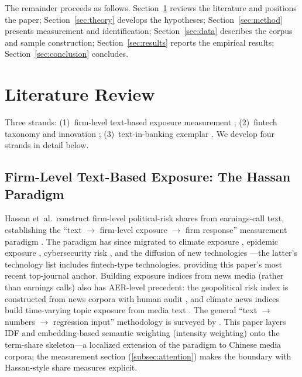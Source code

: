 The remainder proceeds as follows. Section~\ref{sec:lit} reviews the
literature and positions the paper; Section~\ref{sec:theory} develops the
hypotheses; Section~\ref{sec:method} presents measurement and identification;
Section~\ref{sec:data} describes the corpus and sample construction;
Section~\ref{sec:results} reports the empirical results;
Section~\ref{sec:conclusion} concludes.

\section{Literature Review}\label{sec:lit}
Three strands: (1)~firm-level text-based exposure measurement
\autocite{hassan2019firm,florackis2023cybersecurity};
(2)~fintech taxonomy and innovation \autocite{gomber2018fintech,goldstein2019fintech};
(3)~text-in-banking exemplar \autocite{engelberg2018short}.
We develop four strands in detail below.

\subsection{Firm-Level Text-Based Exposure: The Hassan Paradigm}
Hassan et~al.\ construct firm-level political-risk shares from earnings-call
text, establishing the ``text $\to$ firm-level exposure $\to$ firm response''
measurement paradigm \parencite{hassan2019firm}. The paradigm has since
migrated to climate exposure \parencite{sautner2023climate}, epidemic exposure
\parencite{hassan2023epidemic}, cybersecurity risk
\parencite{florackis2023cybersecurity}, and the diffusion of new technologies
\parencite{kalyani2025diffusion}---the latter's technology list includes
fintech-type technologies, providing this paper's most recent top-journal
anchor. Building exposure indices from news media (rather than earnings calls)
also has AER-level precedent: the geopolitical risk index is constructed from
news corpora with human audit \parencite{caldara2022geopolitical}, and climate
news indices build time-varying topic exposure from media text
\parencite{engle2020hedging}. The general ``text $\to$ numbers $\to$
regression input'' methodology is surveyed by \textcite{gentzkow2019text}.
This paper layers IDF and embedding-based semantic weighting (intensity
weighting) onto the term-share skeleton---a localized extension of the
paradigm to Chinese media corpora; the measurement section
(\ref{subsec:attention}) makes the boundary with Hassan-style share measures
explicit.

